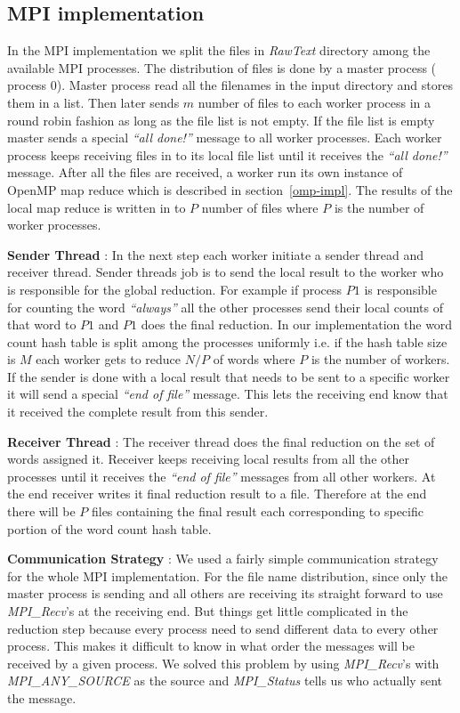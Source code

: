 \documentclass[12pt]{article}
\begin{document}
\subsection{MPI implementation}
In the MPI implementation we split the files in {\em RawText } directory among the available MPI processes. The distribution of files is done by a master process ( process $0$).
Master process read all the filenames in the input directory and stores them in a list. Then later sends $m$  number of files to each worker process in a round robin fashion as long as the file
list is not empty. If the file list is empty master sends a special {\em ``all done!''} message to all worker processes. Each worker process keeps receiving files in to its local file list until
it receives the {\em``all done!''} message. After all the files are received, a worker run its own instance of OpenMP map reduce which is described in section~\ref{omp-impl}. The results of the
local map reduce is written in to $P$ number of files where $P$ is the number of worker processes. 

\noindent \textbf{Sender Thread} : In the next step each worker initiate a sender thread and receiver thread. Sender threads job is
to send the local result to the worker who is responsible for the global reduction. For example if process $P1$ is responsible for counting the word {\em ``always''} all the other processes send their
local counts of that word to $P1$ and $P1$ does the final reduction. In our implementation the word count hash table is split among the processes uniformly i.e. if the hash table size is $M$ each worker gets 
to reduce $N/P$ of words where $P$ is the number of workers. If the sender is done with a local result that needs to be sent to a specific worker it will send a special {\em ``end of file''} message. This
lets the receiving end know that it received the complete result from this sender. 

\noindent \textbf{Receiver Thread} : The receiver thread does the final reduction on the set of words assigned it. Receiver keeps receiving local results from all the other processes until it 
receives the {\em ``end of file''} messages from all 
other workers. At the end receiver writes it final reduction result to a file. Therefore at the end there will be $P$ files containing the final result each corresponding to specific portion of the word 
count hash table. 

\noindent \textbf{Communication Strategy} : We used a fairly simple communication strategy for the whole MPI implementation. For the file name distribution, since only the master process is sending and all others are 
receiving its straight forward to use {\em MPI\_Recv}'s at the receiving end. But things get little complicated in the reduction step because every process need to send different data to every other process. This makes 
it difficult to know in what order the messages will be received by a given process. We solved this problem by using {\em MPI\_Recv}'s with {\em MPI\_ANY\_SOURCE} as the source and {\em MPI\_Status} tells us who actually sent 
the message.
\end{document}
